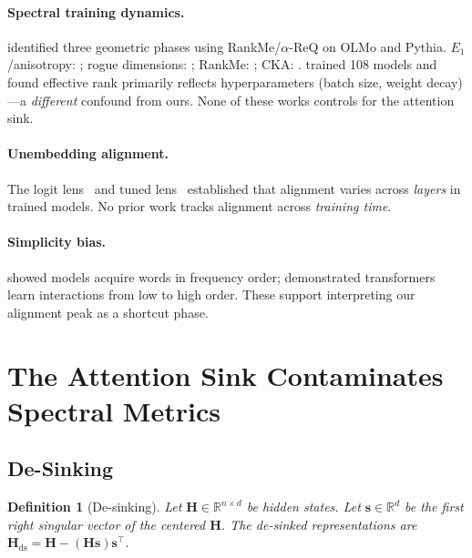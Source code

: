 \documentclass[11pt]{article}
\newtheorem{definition}{Definition}
\begin{document}
\paragraph{Spectral training dynamics.}
\citet{li2025tracing} identified three geometric phases using RankMe/$\alpha$-ReQ on OLMo and Pythia.
$E_1$/anisotropy: \citet{ethayarajh2019contextual}; rogue dimensions: \citet{timkey2021all}; RankMe: \citet{garrido2023rankme}; CKA: \citet{kornblith2019similarity}.
\citet{kulkarni2026disentangling} trained 108 models and found effective rank primarily reflects hyperparameters (batch size, weight decay)---a \emph{different} confound from ours.
None of these works controls for the attention sink.

\paragraph{Unembedding alignment.}
The logit lens~\citep{nostalgebraist2020logit} and tuned lens~\citep{belrose2023eliciting} established that alignment varies across \emph{layers} in trained models.
No prior work tracks alignment across \emph{training time}.

\paragraph{Simplicity bias.}
\citet{chang2022word} showed models acquire words in frequency order; \citet{cagnetta2024distributional} demonstrated transformers learn interactions from low to high order.
These support interpreting our alignment peak as a shortcut phase.

\section{The Attention Sink Contaminates Spectral Metrics}\label{sec:theory}

\subsection{De-Sinking}\label{sec:desink}

\begin{definition}[De-sinking]
Let $\mathbf{H} \in \mathbb{R}^{n \times d}$ be hidden states.
Let $\mathbf{s} \in \mathbb{R}^d$ be the first right singular vector of the centered $\mathbf{H}$.
The de-sinked representations are $\mathbf{H}_{\text{ds}} = \mathbf{H} - (\mathbf{H}\mathbf{s})\mathbf{s}^\top$.
\end{definition}
\end{document}
